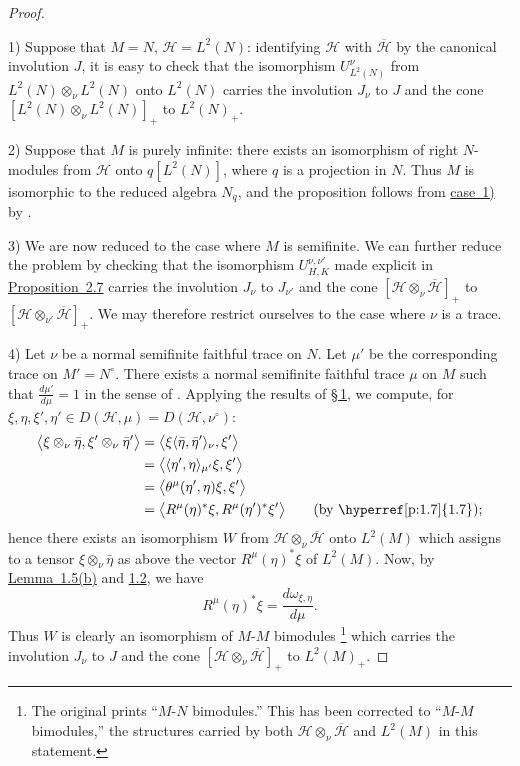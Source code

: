 \documentclass[fontsize=13pt,twoside,headings=small,bookmarkpackage=false]{scrartcl}
\newcommand{\HH}{\mathcal H}
\newcounter{translatornote}
\newcommand{\tfnote}[1]{\stepcounter{translatornote}\begingroup
  \renewcommand{\thefootnote}{T\arabic{translatornote}}\footnote{#1}\endgroup}
\begin{document}
\begin{proof}
\hypertarget{proof:3.1case1}{}1) Suppose that $M=N$, $\HH=L^2(N)$: identifying $\HH$ with $\overline{\HH}$ by the canonical involution $J$, it is easy to check that the isomorphism $U^\nu_{L^2(N)}$ from $L^2(N)\otimes_\nu L^2(N)$ onto $L^2(N)$ carries the involution $J_\nu$ to $J$ and the cone $[L^2(N)\otimes_\nu L^2(N)]_+$ to $L^2(N)_+$.

2) Suppose that $M$ is purely infinite: there exists an isomorphism of right $N$-modules from $\HH$ onto $q[L^2(N)]$, where $q$ is a projection in $N$. Thus $M$ is isomorphic to the reduced algebra $N_q$, and the proposition follows from \hyperlink{proof:3.1case1}{case~1)} by \cite[Lemma~2.6]{4}.

3) We are now reduced to the case where $M$ is semifinite. We can further reduce the problem by checking that the isomorphism $U^{\nu,\nu'}_{H,K}$ made explicit in \hyperref[p:2.7]{Proposition~2.7} carries the involution $J_\nu$ to $J_{\nu'}$ and the cone $[\HH\otimes_\nu\overline{\HH}]_+$ to $[\HH\otimes_{\nu'}\overline{\HH}]_+$. We may therefore restrict ourselves to the case where $\nu$ is a trace.

\hypertarget{proof:3.1case4}{}4) Let $\nu$ be a normal semifinite faithful trace on $N$. Let $\mu'$ be the corresponding trace on $M'=N^\circ$. There exists a normal semifinite faithful trace $\mu$ on $M$ such that $\frac{d\mu'}{d\mu}=1$ in the sense of \cite{1}. Applying the results of \hyperref[sec:1]{\S\,1}, we compute, for $\xi,\eta,\xi',\eta'\in D(\HH,\mu)=D(\HH,\nu^\circ)$:
\begin{align*}
\bigl\langle\xi\otimes_\nu\bar\eta,\xi'\otimes_\nu\bar\eta'\bigr\rangle
&=\bigl\langle\xi\langle\bar\eta,\bar\eta'\rangle_\nu,\xi'\bigr\rangle\\
&=\bigl\langle\langle\eta',\eta\rangle_{\mu'}\xi,\xi'\bigr\rangle\\
&=\bigl\langle\theta^\mu(\eta',\eta)\xi,\xi'\bigr\rangle\\
&=\bigl\langle R^\mu(\eta)^*\xi,R^\mu(\eta')^*\xi'\bigr\rangle
\qquad\text{(by \hyperref[p:1.7]{1.7})};
\end{align*}
hence there exists an isomorphism $W$ from $\HH\otimes_\nu\overline{\HH}$ onto $L^2(M)$ which assigns to a tensor $\xi\otimes_\nu\bar\eta$ as above the vector $R^\mu(\eta)^*\xi$ of $L^2(M)$. Now, by \hyperlink{eq:1.5b}{Lemma~1.5(b)} and \hyperref[p:1.2]{1.2}, we have
\[
R^\mu(\eta)^*\xi=\frac{d\omega_{\xi,\eta}}{d\mu}.
\]
Thus $W$ is clearly an isomorphism of $M$-$M$ bimodules\tfnote{The original prints ``$M$-$N$ bimodules.'' This has been corrected to ``$M$-$M$ bimodules,'' the structures carried by both $\HH\otimes_\nu\overline{\HH}$ and $L^2(M)$ in this statement.} which carries the involution $J_\nu$ to $J$ and the cone $[\HH\otimes_\nu\overline{\HH}]_+$ to $L^2(M)_+$.
\end{proof}
\end{document}
